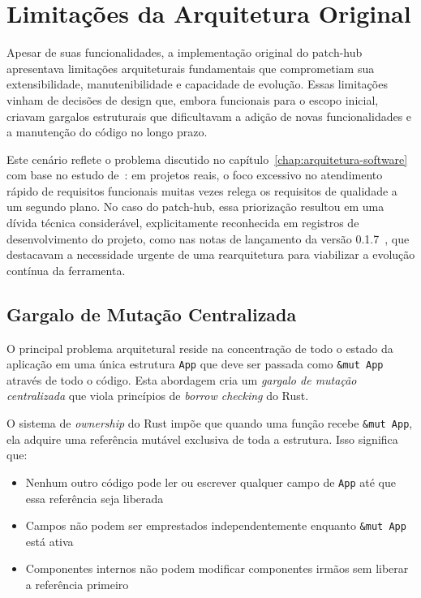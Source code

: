 \section{Limitações da Arquitetura Original}

Apesar de suas funcionalidades, a implementação original do patch-hub apresentava limitações arquiteturais fundamentais que comprometiam sua extensibilidade, manutenibilidade e capacidade de evolução. Essas limitações vinham de decisões de design que, embora funcionais para o escopo inicial, criavam gargalos estruturais que dificultavam a adição de novas funcionalidades e a manutenção do código no longo prazo.

Este cenário reflete o problema discutido no capítulo~\ref{chap:arquitetura-software} com base no estudo de~\cite{kassab2018architectural}: em projetos reais, o foco excessivo no atendimento rápido de requisitos funcionais muitas vezes relega os requisitos de qualidade a um segundo plano. No caso do patch-hub, essa priorização resultou em uma dívida técnica considerável, explicitamente reconhecida em registros de desenvolvimento do projeto, como nas notas de lançamento da versão 0.1.7~\citep{patch_hub_v017}, que destacavam a necessidade urgente de uma rearquitetura para viabilizar a evolução contínua da ferramenta.

\subsection{Gargalo de Mutação Centralizada}

O principal problema arquitetural reside na concentração de todo o estado da aplicação em uma única estrutura \texttt{App} que deve ser passada como \texttt{\&mut App} através de todo o código. Esta abordagem cria um \emph{gargalo de mutação centralizada} que viola princípios de \emph{borrow checking} do Rust.

O sistema de \textit{ownership} do Rust impõe que quando uma função recebe \texttt{\&mut App}, ela adquire uma referência mutável exclusiva de toda a estrutura. Isso significa que:

\begin{itemize}
    \item Nenhum outro código pode ler ou escrever qualquer campo de \texttt{App} até que essa referência seja liberada
    \item Campos não podem ser emprestados independentemente enquanto \texttt{\&mut App} está ativa
    \item Componentes internos não podem modificar componentes irmãos sem liberar a referência primeiro
\end{itemize}

